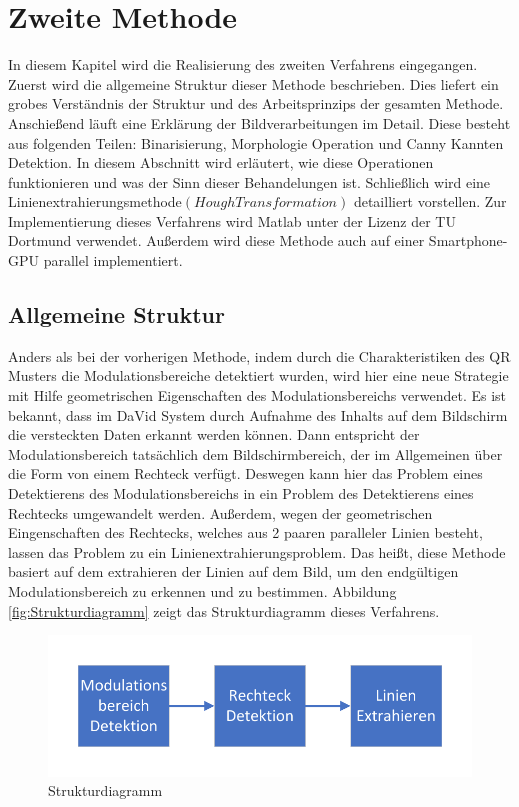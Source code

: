 \chapter{Zweite Methode} \label{cha:ZweiteMethode}

In diesem Kapitel wird die Realisierung des zweiten Verfahrens eingegangen. Zuerst wird die allgemeine Struktur dieser Methode beschrieben. Dies liefert ein grobes Verständnis der Struktur und des Arbeitsprinzips der gesamten Methode. Anschießend läuft eine Erklärung der Bildverarbeitungen im Detail. Diese besteht aus folgenden Teilen: Binarisierung, Morphologie Operation und Canny Kannten Detektion. In diesem Abschnitt wird erläutert, wie diese Operationen funktionieren und was der Sinn dieser Behandelungen ist. Schließlich wird eine Linienextrahierungsmethode$ (Hough Transformation) $ detailliert vorstellen. Zur Implementierung dieses Verfahrens wird Matlab unter der Lizenz der TU Dortmund verwendet. Außerdem wird diese Methode auch auf einer Smartphone-GPU parallel implementiert.

\section{Allgemeine Struktur} 

Anders als bei der vorherigen Methode, indem durch die  Charakteristiken des QR Musters die Modulationsbereiche detektiert wurden, wird hier eine neue Strategie mit Hilfe geometrischen Eigenschaften des Modulationsbereichs verwendet. Es ist bekannt, dass im DaVid System durch Aufnahme des Inhalts auf dem Bildschirm die versteckten Daten erkannt werden können. Dann entspricht der Modulationsbereich tatsächlich dem Bildschirmbereich, der im Allgemeinen über die Form von einem Rechteck verfügt. Deswegen kann hier das Problem eines Detektierens des Modulationsbereichs in ein Problem des Detektierens eines Rechtecks umgewandelt werden. Außerdem, wegen der geometrischen Eingenschaften des Rechtecks, welches aus 2 paaren paralleler Linien besteht, lassen das Problem zu ein Linienextrahierungsproblem. Das heißt, diese Methode basiert auf dem extrahieren der Linien auf dem Bild, um den endgültigen Modulationsbereich zu erkennen und zu bestimmen. Abbildung \ref{fig:Strukturdiagramm} zeigt das Strukturdiagramm dieses Verfahrens.

\begin{figure}[H]
 \centering 
 \includegraphics[keepaspectratio,width=1.0\textwidth]{images/4_ZweiteErfahrung/Strukturdiagramm.pdf}
 \caption{Strukturdiagramm}
 \label{fig:Strukturdiagramm für zweite Methode}
\end{figure}


